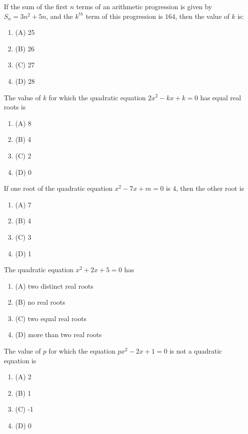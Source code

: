 \documentclass[12pt,a4paper]{exam}
\begin{document}
\begin{questions}
\question[1] If the sum of the first $n$ terms of an arithmetic progression is given by $S_n = 3n^2 + 5n$, and the $k^{th}$ term of this progression is $164$, then the value of $k$ is:
\begin{enumerate}[label=(\Alph*)]
  \item (A) 25
  \item (B) 26
  \item (C) 27
  \item (D) 28
\end{enumerate}
\vspace{0.15cm}

\question[1] The value of $k$ for which the quadratic equation $2x^2 - kx + k = 0$ has equal real roots is
\begin{enumerate}[label=(\Alph*)]
  \item (A) 8
  \item (B) 4
  \item (C) 2
  \item (D) 0
\end{enumerate}
\vspace{0.15cm}

\question[1] If one root of the quadratic equation $x^2 - 7x + m = 0$ is $4$, then the other root is
\begin{enumerate}[label=(\Alph*)]
  \item (A) 7
  \item (B) 4
  \item (C) 3
  \item (D) 1
\end{enumerate}
\vspace{0.15cm}

\question[1] The quadratic equation $x^2 + 2x + 5 = 0$ has
\begin{enumerate}[label=(\Alph*)]
  \item (A) two distinct real roots
  \item (B) no real roots
  \item (C) two equal real roots
  \item (D) more than two real roots
\end{enumerate}
\vspace{0.15cm}

\question[1] The value of $p$ for which the equation $px^2 - 2x + 1 = 0$ is not a quadratic equation is
\begin{enumerate}[label=(\Alph*)]
  \item (A) 2
  \item (B) 1
  \item (C) -1
  \item (D) 0
\end{enumerate}
\vspace{0.15cm}


\end{questions}
\end{document}
